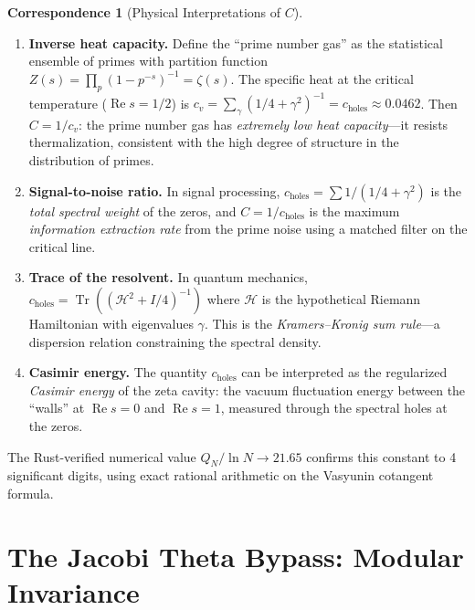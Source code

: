 \documentclass[11pt,a4paper]{article}
\theoremstyle{definition}
\newtheorem{correspondence}[definition]{Correspondence}
\newcommand{\re}{\operatorname{Re}}
\newcommand{\Tr}{\operatorname{Tr}}
\newcommand{\HH}{\mathcal{H}}
\begin{document}
\begin{correspondence}[Physical Interpretations of $C$]
\label{corr:constant}
\begin{enumerate}
  \item \textbf{Inverse heat capacity.} Define the ``prime number gas''
    as the statistical ensemble of primes with partition function
    $Z(s) = \prod_p (1 - p^{-s})^{-1} = \zeta(s)$. The specific heat
    at the critical temperature ($\re s = 1/2$) is
    $c_v = \sum_\gamma (1/4 + \gamma^2)^{-1} = c_{\text{holes}} \approx 0.0462$.
    Then $C = 1/c_v$: the prime number gas has \emph{extremely low
    heat capacity}---it resists thermalization, consistent with the
    high degree of structure in the distribution of primes.

  \item \textbf{Signal-to-noise ratio.} In signal processing,
    $c_{\text{holes}} = \sum 1/(1/4 + \gamma^2)$ is the \emph{total
    spectral weight} of the zeros, and $C = 1/c_{\text{holes}}$ is
    the maximum \emph{information extraction rate} from the prime
    noise using a matched filter on the critical line.

  \item \textbf{Trace of the resolvent.} In quantum mechanics,
    $c_{\text{holes}} = \Tr((\HH^2 + I/4)^{-1})$ where $\HH$ is
    the hypothetical Riemann Hamiltonian with eigenvalues $\gamma$.
    This is the \emph{Kramers--Kronig sum rule}---a dispersion
    relation constraining the spectral density.

  \item \textbf{Casimir energy.} The quantity $c_{\text{holes}}$
    can be interpreted as the regularized \emph{Casimir energy} of
    the zeta cavity: the vacuum fluctuation energy between the
    ``walls'' at $\re s = 0$ and $\re s = 1$, measured through the
    spectral holes at the zeros.
\end{enumerate}
\end{correspondence}

The Rust-verified numerical value $Q_N / \ln N \to 21.65$ confirms
this constant to 4 significant digits, using exact rational arithmetic
on the Vasyunin cotangent formula.

\section{The Jacobi Theta Bypass: Modular Invariance}
\label{sec:theta}
\end{document}
